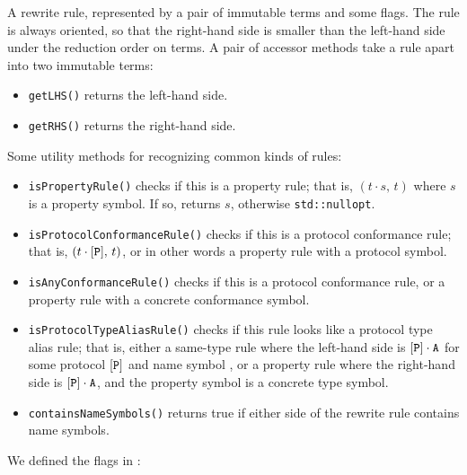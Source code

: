 \documentclass[../generics]{subfiles}
\begin{document}
A rewrite rule, represented by a pair of immutable terms and some flags. The rule is always oriented, so that the right-hand side is smaller than the left-hand side under the reduction order on terms. A pair of accessor methods take a rule apart into two immutable terms:
\begin{itemize}
\item \texttt{getLHS()} returns the left-hand side.
\item \texttt{getRHS()} returns the right-hand side.
\end{itemize}
Some utility methods for recognizing common kinds of rules:
\begin{itemize}
\item \texttt{isPropertyRule()} checks if this is a property rule; that is, $(t\cdot s,\,t)$ where $s$ is a property symbol. If so, returns $s$, otherwise \texttt{std::nullopt}.
\item \texttt{isProtocolConformanceRule()} checks if this is a protocol conformance rule; that is, $(t\cdot[\texttt{P}],\,t)$, or in other words a property rule with a protocol symbol.
\item \texttt{isAnyConformanceRule()} checks if this is a protocol conformance rule, or a property rule with a concrete conformance symbol.
\item \texttt{isProtocolTypeAliasRule()} checks if this rule looks like a protocol type alias rule; that is, either a same-type rule where the left-hand side is $[\texttt{P}]\cdot\texttt{A}$ for some protocol $[\texttt{P}]$ and name symbol \nA, or a property rule where the right-hand side is $[\texttt{P}]\cdot\texttt{A}$, and the property symbol is a concrete type symbol.
\item \texttt{containsNameSymbols()} returns true if either side of the rewrite rule contains name symbols.
\end{itemize}
We defined the flags in :
\end{document}
